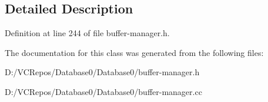 \subsection{Detailed Description}


Definition at line 244 of file buffer-\/manager.\+h.



The documentation for this class was generated from the following files\+:\begin{DoxyCompactItemize}
\item 
D\+:/\+V\+C\+Repos/\+Database0/\+Database0/buffer-\/manager.\+h\item 
D\+:/\+V\+C\+Repos/\+Database0/\+Database0/buffer-\/manager.\+cc\end{DoxyCompactItemize}
